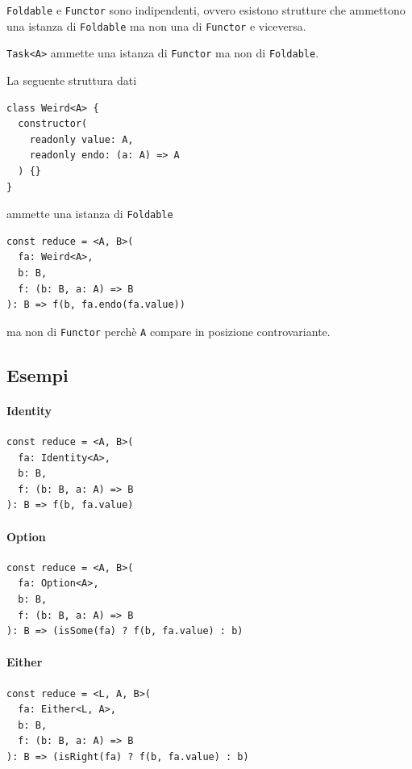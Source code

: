 \documentclass[12pt]{article}
\begin{document}
\texttt{Foldable} e \texttt{Functor} sono indipendenti, ovvero esistono strutture che ammettono una istanza di \texttt{Foldable} ma non una di
\texttt{Functor} e viceversa.

\texttt{Task<A>} ammette una istanza di \texttt{Functor} ma non di \texttt{Foldable}.

La seguente struttura dati

\begin{verbatim}
class Weird<A> {
  constructor(
    readonly value: A,
    readonly endo: (a: A) => A
  ) {}
}
\end{verbatim}

ammette una istanza di \texttt{Foldable}

\begin{verbatim}
const reduce = <A, B>(
  fa: Weird<A>,
  b: B,
  f: (b: B, a: A) => B
): B => f(b, fa.endo(fa.value))
\end{verbatim}

ma non di \texttt{Functor} perchè \texttt{A} compare in posizione controvariante.

\subsection{Esempi}

\paragraph{Identity}

\begin{verbatim}
const reduce = <A, B>(
  fa: Identity<A>,
  b: B,
  f: (b: B, a: A) => B
): B => f(b, fa.value)
\end{verbatim}

\paragraph{Option}

\begin{verbatim}
const reduce = <A, B>(
  fa: Option<A>,
  b: B,
  f: (b: B, a: A) => B
): B => (isSome(fa) ? f(b, fa.value) : b)
\end{verbatim}

\paragraph{Either}

\begin{verbatim}
const reduce = <L, A, B>(
  fa: Either<L, A>,
  b: B,
  f: (b: B, a: A) => B
): B => (isRight(fa) ? f(b, fa.value) : b)
\end{verbatim}
\end{document}
